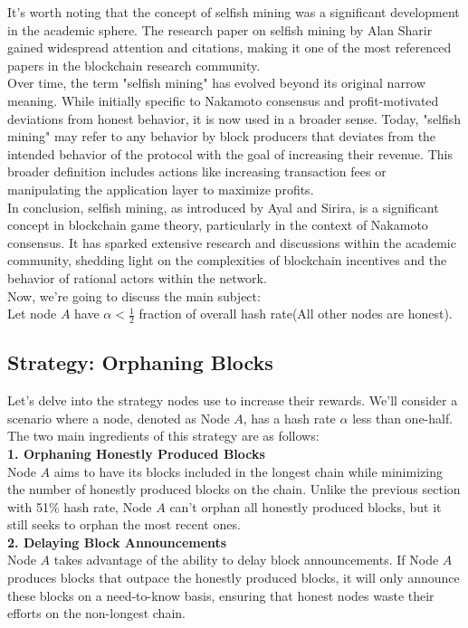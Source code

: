 It's worth noting that the concept of selfish mining was a significant development in the academic sphere. The research paper on selfish mining by Alan Sharir gained widespread attention and citations, making it one of the most referenced papers in the blockchain research community.\\

Over time, the term "selfish mining" has evolved beyond its original narrow meaning. While initially specific to Nakamoto consensus and profit-motivated deviations from honest behavior, it is now used in a broader sense. Today, "selfish mining" may refer to any behavior by block producers that deviates from the intended behavior of the protocol with the goal of increasing their revenue. This broader definition includes actions like increasing transaction fees or manipulating the application layer to maximize profits.\\

In conclusion, selfish mining, as introduced by Ayal and Sirira, is a significant concept in blockchain game theory, particularly in the context of Nakamoto consensus. It has sparked extensive research and discussions within the academic community, shedding light on the complexities of blockchain incentives and the behavior of rational actors within the network.\\

Now, we're going to discuss the main subject:\\
Let node $A$ have $\alpha < \frac{1}{2}$ fraction of overall hash rate(All other nodes are honest).
\subsection{Strategy: Orphaning Blocks}

Let's delve into the strategy nodes use to increase their rewards. We'll consider a scenario where a node, denoted as Node $A$, has a hash rate $\alpha$ less than one-half. The two main ingredients of this strategy are as follows:\\
\noindent
\textbf{1. Orphaning Honestly Produced Blocks}\\
Node $A$ aims to have its blocks included in the longest chain while minimizing the number of honestly produced blocks on the chain. Unlike the previous section with 51\% hash rate, Node $A$ can't orphan all honestly produced blocks, but it still seeks to orphan the most recent ones.\\
\noindent
\textbf{2. Delaying Block Announcements}\\
Node $A$ takes advantage of the ability to delay block announcements. If Node $A$ produces blocks that outpace the honestly produced blocks, it will only announce these blocks on a need-to-know basis, ensuring that honest nodes waste their efforts on the non-longest chain.\\

